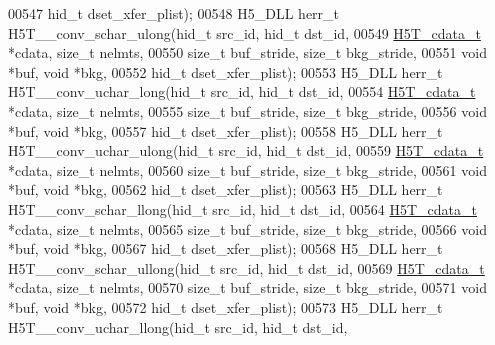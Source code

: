 \begin{DoxyCode}
00547                                    hid\_t dset\_xfer\_plist);
00548 H5\_DLL herr\_t H5T\_\_conv\_schar\_ulong(hid\_t src\_id, hid\_t dst\_id,
00549                     \hyperlink{struct_h5_t__cdata__t}{H5T\_cdata\_t} *cdata, \textcolor{keywordtype}{size\_t} nelmts,
00550                     \textcolor{keywordtype}{size\_t} buf\_stride, \textcolor{keywordtype}{size\_t} bkg\_stride,
00551                                     \textcolor{keywordtype}{void} *buf, \textcolor{keywordtype}{void} *bkg,
00552                                     hid\_t dset\_xfer\_plist);
00553 H5\_DLL herr\_t H5T\_\_conv\_uchar\_long(hid\_t src\_id, hid\_t dst\_id,
00554                    \hyperlink{struct_h5_t__cdata__t}{H5T\_cdata\_t} *cdata, \textcolor{keywordtype}{size\_t} nelmts,
00555                    \textcolor{keywordtype}{size\_t} buf\_stride, \textcolor{keywordtype}{size\_t} bkg\_stride,
00556                                    \textcolor{keywordtype}{void} *buf, \textcolor{keywordtype}{void} *bkg,
00557                                    hid\_t dset\_xfer\_plist);
00558 H5\_DLL herr\_t H5T\_\_conv\_uchar\_ulong(hid\_t src\_id, hid\_t dst\_id,
00559                     \hyperlink{struct_h5_t__cdata__t}{H5T\_cdata\_t} *cdata, \textcolor{keywordtype}{size\_t} nelmts,
00560                     \textcolor{keywordtype}{size\_t} buf\_stride, \textcolor{keywordtype}{size\_t} bkg\_stride,
00561                                     \textcolor{keywordtype}{void} *buf, \textcolor{keywordtype}{void} *bkg,
00562                                     hid\_t dset\_xfer\_plist);
00563 H5\_DLL herr\_t H5T\_\_conv\_schar\_llong(hid\_t src\_id, hid\_t dst\_id,
00564                     \hyperlink{struct_h5_t__cdata__t}{H5T\_cdata\_t} *cdata, \textcolor{keywordtype}{size\_t} nelmts,
00565                     \textcolor{keywordtype}{size\_t} buf\_stride, \textcolor{keywordtype}{size\_t} bkg\_stride,
00566                                     \textcolor{keywordtype}{void} *buf, \textcolor{keywordtype}{void} *bkg,
00567                                     hid\_t dset\_xfer\_plist);
00568 H5\_DLL herr\_t H5T\_\_conv\_schar\_ullong(hid\_t src\_id, hid\_t dst\_id,
00569                      \hyperlink{struct_h5_t__cdata__t}{H5T\_cdata\_t} *cdata, \textcolor{keywordtype}{size\_t} nelmts,
00570                      \textcolor{keywordtype}{size\_t} buf\_stride, \textcolor{keywordtype}{size\_t} bkg\_stride,
00571                                      \textcolor{keywordtype}{void} *buf, \textcolor{keywordtype}{void} *bkg,
00572                                      hid\_t dset\_xfer\_plist);
00573 H5\_DLL herr\_t H5T\_\_conv\_uchar\_llong(hid\_t src\_id, hid\_t dst\_id,

\end{DoxyCode}
